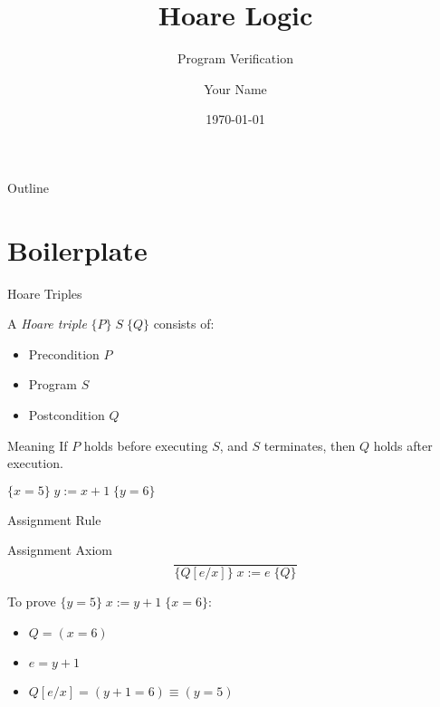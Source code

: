 \documentclass[11pt]{beamer}
\title{Hoare Logic}
\subtitle{Program Verification}
\author{Your Name}
\date{\today}
\renewcommand{\hoare}[3]{\{#1\}\; #2\; \{#3\}}
\newcommand{\assign}[2]{#1 := #2}
\newcommand{\subst}[3]{#1[#2/#3]}
\begin{document}
\begin{frame}
    \titlepage
\end{frame}

\begin{frame}{Outline}
    \tableofcontents
\end{frame}





\section{Boilerplate}
\begin{frame}{Hoare Triples}
    \begin{definition}
        A \emph{Hoare triple} $\hoare{P}{S}{Q}$ consists of:
        \begin{itemize}
            \item Precondition $P$
            \item Program $S$
            \item Postcondition $Q$
        \end{itemize}
    \end{definition}
    
    \begin{block}{Meaning}
        If $P$ holds before executing $S$, and $S$ terminates, then $Q$ holds after execution.
    \end{block}
    
    \begin{example}
        $\hoare{x = 5}{\assign{y}{x + 1}}{y = 6}$
    \end{example}
\end{frame}

\begin{frame}[fragile]{Assignment Rule}
    \begin{block}{Assignment Axiom}
        \[
        \frac{}{\hoare{\subst{Q}{e}{x}}{\assign{x}{e}}{Q}}
        \]
    \end{block}
    
    \begin{example}
        To prove $\hoare{y = 5}{\assign{x}{y + 1}}{x = 6}$:
        \begin{itemize}
            \item $Q = (x = 6)$
            \item $e = y + 1$
            \item $\subst{Q}{e}{x} = (y + 1 = 6) \equiv (y = 5)$
        \end{itemize}
    \end{example}
\end{frame}
\end{document}
